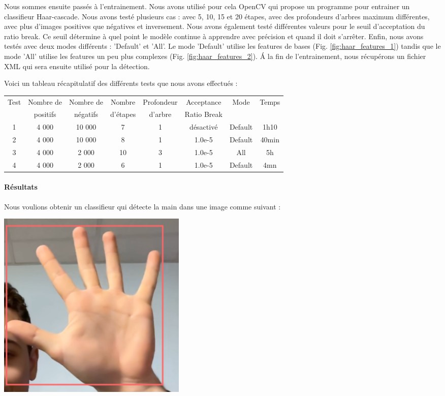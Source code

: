 \documentclass[11pt]{article}
\begin{document}
Nous sommes ensuite passés à l'entrainement. Nous avons utilisé pour cela OpenCV \cite{opencv} qui propose un programme pour entrainer un classifieur Haar-cascade. Nous avons testé plusieurs cas : avec 5, 10, 15 et 20 étapes, avec des profondeurs d'arbres maximum différentes, avec plus d'images positives que négatives et inversement. Nous avons également testé différentes valeurs pour le seuil d'acceptation du ratio break. Ce seuil détermine à quel point le modèle continue à apprendre avec précision et quand il doit s'arrêter. Enfin, nous avons testés avec deux modes différents :  'Default' et 'All'. Le mode 'Default' utilise les features de bases (Fig. \ref{fig:haar_features_1}) tandis que le mode 'All' utilise les features un peu plus complexes (Fig. \ref{fig:haar_features_2}). \'A la fin de l'entrainement, nous récupérons un fichier XML qui sera ensuite utilisé pour la détection.\bigbreak

\bigbreak

\noindent Voici un tableau récapitulatif des différents tests que nous avons effectués : \bigbreak

\begin{center} 
    \begin{tabular}{|c|c|c|c|c|c|c|c|}
        \hline
        Test & Nombre de & Nombre de & Nombre & Profondeur & Acceptance  & Mode & Temps \\
        & positifs & négatifs & d'étapes & d'arbre & Ratio Break &  &  \\ 
        \hline 
        1 & 4 000 & 10 000 & 7 & 1 & désactivé & Default & 1h10 \\ 
        \hline
        2 & 4 000 & 10 000 & 8 & 1 & 1.0e-5 & Default & 40min \\
        \hline
        3 & 4 000 & 2 000 & 10 & 3 & 1.0e-5 & All & 5h \\
        \hline
        4 & 4 000 & 2 000 & 6 & 1 & 1.0e-5 & Default & 4mn \\
        \hline
    \end{tabular}
\end{center}

\bigbreak
\newpage
\paragraph{Résultats}
Nous voulions obtenir un classifieur qui détecte la main dans une image comme suivant : 
\begin{center}
    \includegraphics[width=0.4\textwidth]{images/res_attendu.png}
\end{center}
\end{document}
